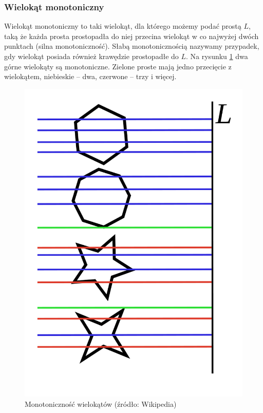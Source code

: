 \documentclass[12pt, a4paper]{article}
\begin{document}
\subsubsection*{Wielokąt monotoniczny}

Wielokąt monotoniczny to taki wielokąt, dla którego możemy podać prostą $L$, taką że każda prosta prostopadła do niej przecina wielokąt w co najwyżej dwóch punktach (silna monotoniczność). Słabą monotonicznością nazywamy przypadek, gdy wielokąt posiada również krawędzie
prostopadłe do $L$. Na rysunku \ref{fig:wielokat_monotoniczny} dwa górne wielokąty są monotoniczne. Zielone proste mają jedno przecięcie z wielokątem, niebieskie – dwa, czerwone – trzy i więcej.

\begin{figure}[H]
  \begin{center}
  \includegraphics[scale=0.24]{Monotonic}
  \caption{Monotoniczność wielokątów (źródło: Wikipedia)}
  \label{fig:wielokat_monotoniczny}
  \end{center}
\end{figure}
\end{document}
